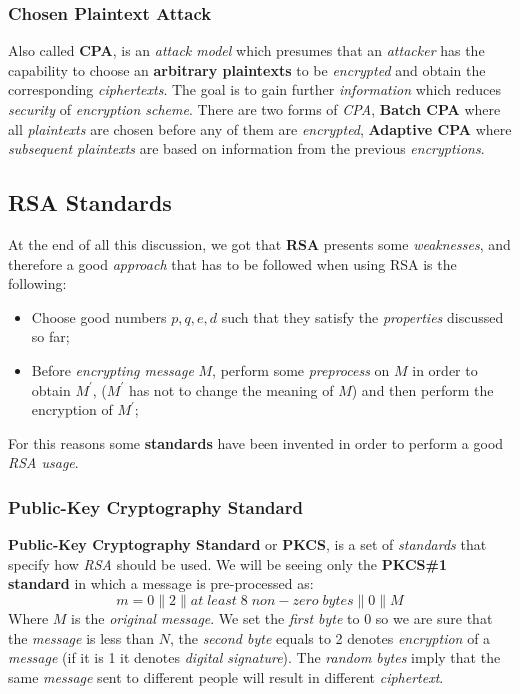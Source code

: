 \documentclass{article}
\begin{document}
\subsubsection{Chosen Plaintext Attack}
Also called \textbf{CPA}, is an \emph{attack model} which presumes that an \emph{attacker} has the capability to choose an \textbf{arbitrary plaintexts} to be \emph{encrypted} and obtain the corresponding \emph{ciphertexts}. The goal is to gain further \emph{information} which reduces \emph{security} of \emph{encryption scheme}. There are two forms of \emph{CPA}, \textbf{Batch CPA} where all \emph{plaintexts} are chosen before any of them are \emph{encrypted}, \textbf{Adaptive CPA} where \emph{subsequent plaintexts} are based on information from the previous \emph{encryptions}. 
\subsection{RSA Standards}
At the end of all this discussion, we got that \textbf{RSA} presents some \emph{weaknesses}, and therefore a good \emph{approach} that has to be followed when using RSA is the following:
\begin{itemize}
\item Choose good numbers $p,q,e,d$ such that they satisfy the \emph{properties} discussed so far;
\item Before \emph{encrypting message} $M$, perform some \emph{preprocess} on $M$ in order to obtain $M^{'}$, ($M^{'}$ has not to change the meaning of $M$) and then perform the encryption of $M^{'}$;
\end{itemize} 
For this reasons some \textbf{standards} have been invented in order to perform a good \emph{RSA usage}. 
\subsubsection{Public-Key Cryptography Standard}
\textbf{Public-Key Cryptography Standard} or \textbf{PKCS}, is a set of \emph{standards} that specify how \emph{RSA} should be used. We will be seeing only the \textbf{PKCS\#1 standard} in which a message is pre-processed as:
\[ m = 0 \parallel 2 \parallel at\; least\; 8\; non-zero\; bytes \parallel 0 \parallel M\]
Where $M$ is the \emph{original message}. We set the \emph{first byte} to 0 so we are sure that the \emph{message} is less than $N$, the \emph{second byte} equals to 2 denotes \emph{encryption} of a \emph{message} (if it is 1 it denotes \emph{digital signature}). The \emph{random bytes} imply that the same \emph{message} sent to different people will result in different \emph{ciphertext}. 
\end{document}
